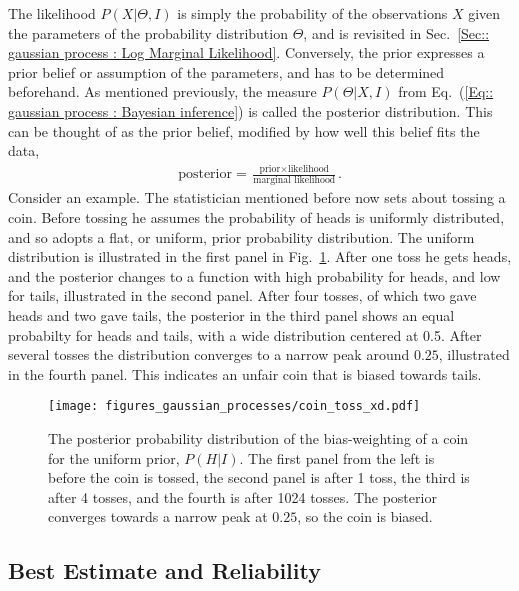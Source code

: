 \documentclass[twoside,english]{uiofysmaster}
\begin{document}
{The likelihood $P(X |\Theta, I)$ is simply the probability of the observations $X$ given the parameters of the probability distribution $\Theta$, and is revisited in Sec.~\ref{Sec:: gaussian process : Log Marginal Likelihood}. Conversely, the prior expresses a prior belief or assumption of the parameters, and has to be determined beforehand. As mentioned previously, the measure $P(\Theta | X , I)$ from Eq.~(\ref{Eq:: gaussian process : Bayesian inference}) is called the posterior distribution. This can be thought of as the prior belief, modified by how well this belief fits the data,
\begin{align*}
\text{posterior} = \frac{\text{prior} \times \text{likelihood}}{\text{marginal likelihood}}.
\end{align*}
Consider an example. The statistician mentioned before now sets about tossing a coin. Before tossing he assumes the probability of heads is uniformly distributed, and so adopts a flat, or uniform, prior probability distribution. The uniform distribution is illustrated in the first panel in Fig.~\ref{Fig:: gaussian process : Dice throw }. After one toss he gets heads, and the posterior changes to a function with high probability for heads, and low for tails, illustrated in the second panel. After four tosses, of which two gave heads and two gave tails, the posterior in the third panel shows an equal probabilty for heads and tails, with a wide distribution centered at 0.5. After several tosses the distribution converges to a narrow peak around $0.25$, illustrated in the fourth panel. This indicates an unfair coin that is biased towards tails.

\begin{figure}
\texttt{[image: figures\_gaussian\_processes/coin\_toss\_xd.pdf]}
\caption{The posterior probability distribution of the bias-weighting of a coin for the uniform prior, $P(H|I)$. The first panel from the left is before the coin is tossed, the second panel is after 1 toss, the third is after 4 tosses, and the fourth is after 1024 tosses. The posterior converges towards a narrow peak at $0.25$, so the coin is biased.}
\label{Fig:: gaussian process : Dice throw }
\end{figure}


\subsection{Best Estimate and Reliability}\label{Sec:: gaussian process : Best estimate}

}
\end{document}
